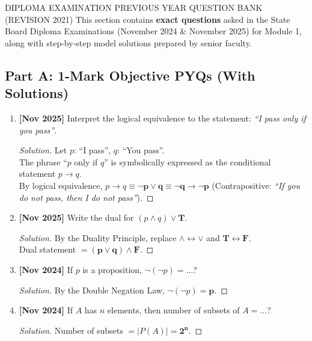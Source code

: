 \documentclass[11pt,a4paper]{article}
\newenvironment{sol}{\begin{proof}[Solution]}{\end{proof}}
\begin{document}
\begin{pyqbox}{DIPLOMA EXAMINATION PREVIOUS YEAR QUESTION BANK (REVISION 2021)}
This section contains \textbf{exact questions} asked in the State Board Diploma Examinations (November 2024 \& November 2025) for Module 1, along with step-by-step model solutions prepared by senior faculty.
\end{pyqbox}

\subsection{Part A: 1-Mark Objective PYQs (With Solutions)}

\begin{enumerate}[leftmargin=1.5em, label=\textbf{Q\arabic*:}]
    \item \textbf{[Nov 2025]} Interpret the logical equivalence to the statement: \textit{``I pass only if you pass''}.
    \begin{sol}
    Let $p$: ``I pass'', $q$: ``You pass''. \\
    The phrase ``$p$ only if $q$'' is symbolically expressed as the conditional statement \textbf{$p \rightarrow q$}. \\
    By logical equivalence, $p \rightarrow q \equiv \mathbf{\neg p \lor q} \equiv \mathbf{\neg q \rightarrow \neg p}$ (Contrapositive: \textit{``If you do not pass, then I do not pass''}).
    \end{sol}
    \vspace{4pt}

    \item \textbf{[Nov 2025]} Write the dual for $(p \land q) \lor \mathbf{T}$.
    \begin{sol}
    By the Duality Principle, replace $\land \leftrightarrow \lor$ and $\mathbf{T} \leftrightarrow \mathbf{F}$. \\
    Dual statement $= \mathbf{(p \lor q) \land \mathbf{F}}$.
    \end{sol}
    \vspace{4pt}

    \item \textbf{[Nov 2024]} If $p$ is a proposition, $\neg(\neg p) = \dots$?
    \begin{sol}
    By the Double Negation Law, $\neg(\neg p) = \mathbf{p}$.
    \end{sol}
    \vspace{4pt}

    \item \textbf{[Nov 2024]} If $A$ has $n$ elements, then number of subsets of $A = \dots$?
    \begin{sol}
    Number of subsets $= |P(A)| = \mathbf{2^n}$.
    \end{sol}
\end{enumerate}
\end{document}
